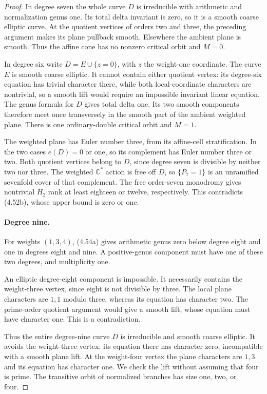 \begin{proof}
In degree seven the whole curve $D$ is
irreducible with arithmetic and normalization
genus one. Its total delta invariant is zero,
so it is a smooth coarse elliptic curve.
At the quotient vertices of orders two and
three, the preceding argument makes its plane
pullback smooth. Elsewhere the ambient plane
is smooth. Thus the affine cone has no
nonzero critical orbit and $M=0$.

In degree six write $D=E\cup\{z=0\}$, with
$z$ the weight-one coordinate. The curve $E$
is smooth coarse elliptic. It cannot contain
either quotient vertex: its degree-six
equation has trivial character there, while
both local-coordinate characters are
nontrivial, so a smooth lift would require
an impossible invariant linear equation.
The genus formula for $D$ gives total delta
one. Its two smooth components therefore
meet once transversely in the smooth part
of the ambient weighted plane. There is
one ordinary-double critical orbit and
$M=1$.

The weighted plane has Euler number three,
from its affine-cell stratification. In the
two cases $e(D)=0$ or one, so its complement
has Euler number three or two. Both quotient
vertices belong to $D$, since degree seven
is divisible by neither two nor three.
The weighted $\mathbb C^*$ action is free
off $D$, so $\{P_7=1\}$ is an unramified
sevenfold cover of that complement. The
free order-seven monodromy gives nontrivial
$H_2$ rank at least eighteen or twelve,
respectively. This contradicts (4.52b),
whose upper bound is zero or one.

\paragraph{Degree nine.}
For weights $(1,3,4)$, (4.54a) gives
arithmetic genus zero below degree eight
and one in degrees eight and nine.
A positive-genus component must have one
of these two degrees, and multiplicity one.

An elliptic degree-eight component is
impossible. It necessarily contains the
weight-three vertex, since eight is not
divisible by three. The local plane
characters are $1,1$ modulo three, whereas
its equation has character two. The
prime-order quotient argument would give
a smooth lift, whose equation must have
character one. This is a contradiction.

Thus the entire degree-nine curve $D$ is
irreducible and smooth coarse elliptic.
It avoids the weight-three vertex: its
equation there has character zero,
incompatible with a smooth plane lift.
At the weight-four vertex the plane
characters are $1,3$ and its equation
has character one. We check the lift
without assuming that four is prime.
The transitive orbit of normalized
branches has size one, two, or four.


\end{proof}

